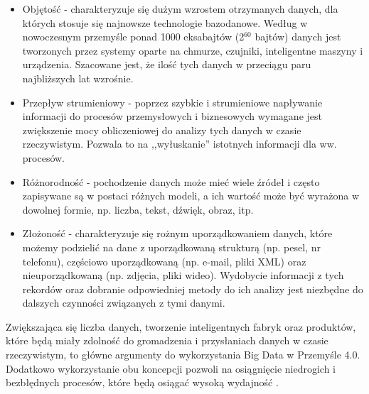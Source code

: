 \begin{itemize}
	\item Objętość - charakteryzuje się dużym wzrostem otrzymanych danych, dla których stosuje się najnowsze technologie bazodanowe. Według \cite{Industry40} w nowoczesnym przemyśle ponad 1000 eksabajtów (2$^{60}$ bajtów) danych jest tworzonych przez systemy oparte na chmurze, czujniki, inteligentne maszyny i urządzenia. Szacowane jest, że ilość tych danych w przeciągu paru najbliższych lat wzrośnie.
	
	\item Przepływ strumieniowy - poprzez szybkie i strumieniowe napływanie informacji do procesów przemysłowych i biznesowych wymagane jest zwiększenie mocy obliczeniowej do analizy tych danych w czasie rzeczywistym. Pozwala to na ,,wyłuskanie'' istotnych informacji dla ww. procesów.
	
	\item Różnorodność - pochodzenie danych może mieć wiele źródeł i często zapisywane są w postaci różnych modeli, a ich wartość może być wyrażona w dowolnej formie, np. liczba, tekst, dźwięk, obraz, itp.
	
	\item Złożoność - charakteryzuje się rożnym uporządkowaniem danych, które możemy podzielić na dane z uporządkowaną strukturą (np. pesel, nr telefonu), częściowo uporządkowaną (np. e-mail, pliki XML) oraz nieuporządkowaną (np. zdjęcia, pliki wideo). Wydobycie informacji z tych rekordów oraz dobranie odpowiedniej metody do ich analizy jest niezbędne do dalszych czynności związanych z tymi danymi. 
	
\end{itemize} 


Zwiększająca się liczba danych, tworzenie inteligentnych fabryk oraz produktów, które będą miały zdolność do gromadzenia i przysłaniach danych w czasie rzeczywistym, to główne argumenty do wykorzystania Big Data w Przemyśle 4.0. Dodatkowo wykorzystanie obu koncepcji pozwoli na osiągnięcie niedrogich i bezbłędnych procesów, które będą osiągać wysoką wydajność \cite{Industry40}.  



